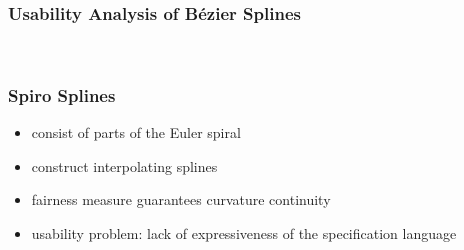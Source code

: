 \documentclass[mathserif]{beamer}
\begin{document}
		\begin{frame}
			\frametitle{Usability Analysis of Bézier Splines}
			\\
		\end{frame}

		\begin{frame}
			\frametitle{Spiro Splines}
			\begin{itemize}
				\item consist of parts of the Euler spiral
				\item construct interpolating splines
				\item fairness measure guarantees curvature continuity
				\item usability problem: lack of expressiveness of the specification language
			\end{itemize}
		\end{frame}
\end{document}
